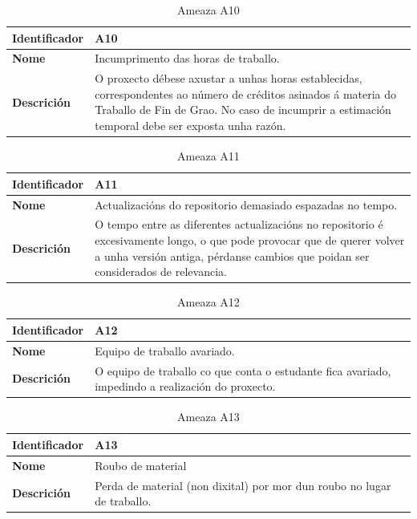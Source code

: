 \begin{table}[H]
\caption{Ameaza A10}
\label{A10}
\begin{tabularx}{\textwidth}{|l|X|}
\hline
\textbf{Identificador} & A10 \\ \hline
\textbf{Nome} & Incumprimento das horas de traballo. \\ \hline
\textbf{Descrición} & O proxecto débese axustar a unhas horas establecidas, correspondentes ao número de créditos asinados á materia do Traballo de Fin de Grao. No caso de incumprir a estimación temporal debe ser exposta unha razón. \\ \hline
\end{tabularx}
\end{table}

\begin{table}[H]
\caption{Ameaza A11}
\label{A11}
\begin{tabularx}{\textwidth}{|l|X|}
\hline
\textbf{Identificador} & A11 \\ \hline
\textbf{Nome} & Actualizacións do repositorio demasiado espazadas no tempo.  \\ \hline
\textbf{Descrición} & O tempo entre as diferentes actualizacións no repositorio é excesivamente longo, o que pode provocar que de querer volver a unha versión antiga, pérdanse cambios que poidan ser considerados de relevancia. \\ \hline
\end{tabularx}
\end{table}

\begin{table}[H]
\caption{Ameaza A12}
\label{A12}
\begin{tabularx}{\textwidth}{|l|X|}
\hline
\textbf{Identificador} & A12 \\ \hline
\textbf{Nome} & Equipo de traballo avariado. \\ \hline
\textbf{Descrición} & O equipo de traballo co que conta o estudante fica avariado, impedindo a realización do proxecto. \\ \hline
\end{tabularx}
\end{table}

\begin{table}[H]
\caption{Ameaza A13}
\label{A13}
\begin{tabularx}{\textwidth}{|l|X|}
\hline
\textbf{Identificador} & A13 \\ \hline
\textbf{Nome} & Roubo de material \\ \hline
\textbf{Descrición} & Perda de material (non dixital) por mor dun roubo no lugar de traballo. \\ \hline
\end{tabularx}
\end{table}

